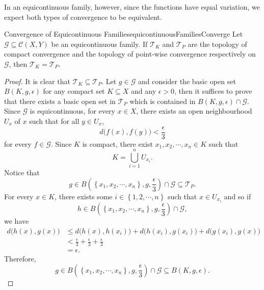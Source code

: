 \documentclass[math]{amznotes}
\theoremstyle{remark}
\begin{document}
In an equicontinuous family, however, since the functions have equal variation, we expect both types of convergence to be equivalent.
\begin{probox}{Convergence of Equicontinuous Families}{equicontinuousFamiliesConverge}
    Let $\mathcal{G} \subseteq \mathcal{C}\left(X, Y\right)$ be an equicontinuous family. If $\mathcal{T}_K$ and $\mathcal{T}_P$ are the topology of compact convergence and the topology of point-wise convergence respectively on $\mathcal{G}$, then $\mathcal{T}_K = \mathcal{T}_P$.
    \tcblower
    \begin{proof}
        It is clear that $\mathcal{T}_K \subseteq \mathcal{T}_P$. Let $g \in \mathcal{G}$ and consider the basic open set $B\left(K, g, \epsilon\right)$ for any compact set $K \subseteq X$ and any $\epsilon > 0$, then it suffices to prove that there exists a basic open set in $\mathcal{T}_P$ which is contained in $B\left(K, g, \epsilon\right) \cap \mathcal{G}$. Since $\mathcal{G}$ is equicontinuous, for every $x \in X$, there exists an open neighbourhood $U_x$ of $x$ such that for all $y \in U_x$, 
        \begin{equation*}
            d\bigl(f\left(x\right), f\left(y\right)\bigr) < \frac{\epsilon}{3}
        \end{equation*}
        for every $f \in \mathcal{G}$. Since $K$ is compact, there exist $x_1, x_2, \cdots, x_n \in K$ such that 
        \begin{equation*}
            K = \bigcup_{i = 1}^nU_{x_i}.
        \end{equation*}
        Notice that 
        \begin{equation*}
            g \in B\left(\left\{x_1, x_2, \cdots, x_n\right\}, g, \frac{\epsilon}{3}\right) \cap \mathcal{G} \subseteq \mathcal{T}_P.
        \end{equation*}
        For every $x \in K$, there exists some $i \in \left\{1, 2, \cdots, n\right\}$ such that $x \in U_{x_i}$ and so if 
        \begin{equation*}
            h \in B\left(\left\{x_1, x_2, \cdots, x_n\right\}, g, \frac{\epsilon}{3}\right) \cap \mathcal{G},
        \end{equation*}
        we have 
        \begin{align*}
            d\bigl(h\left(x\right), g\left(x\right)\bigr) & \leq d\bigl(h\left(x\right), h\left(x_i\right)\bigr) + d\bigl(h\left(x_i\right), g\left(x_i\right)\bigr) + d\bigl(g\left(x_i\right), g\left(x\right)\bigr) \\
            & < \frac{\epsilon}{3} + \frac{\epsilon}{3} + \frac{\epsilon}{3} \\
            & = \epsilon.
        \end{align*}
        Therefore, 
        \begin{equation*}
            g \in B\left(\left\{x_1, x_2, \cdots, x_n\right\}, g, \frac{\epsilon}{3}\right) \cap \mathcal{G} \subseteq B\left(K, g, \epsilon\right).
        \end{equation*}
    \end{proof}
\end{probox}
\end{document}
